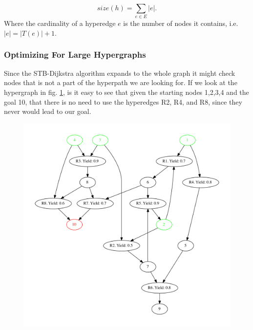 \documentclass[a4paper,10pt,titlepage]{paper}
\begin{document}
\begin{equation}
size(h) = \displaystyle\sum_{e\in E} |e|.
\end{equation}
Where the cardinality of a hyperedge $e$ is the number of nodes it contains, i.e. $|e| = |T(e)| + 1$.\cite{Nielsen}
\subsubsection{Optimizing For Large Hypergraphs}\label{Pruning}
Since the STB-Dijkstra algorithm expands to the whole graph it might check nodes that is not a part of the hyperpath we are looking for. If we look at the hypergraph in fig. \ref{fig::DeadEnd}, is it easy to see that given the starting nodes 1,2,3,4 and the goal 10, that there is no need to use the hyperedges R2, R4, and R8, since they never would lead to our goal.
\begin{figure}[H]
\centering
\includegraphics[scale=0.4]{Billeder/DeadEnd.pdf}
\caption{}
\label{fig::DeadEnd}
\end{figure}
\end{document}
